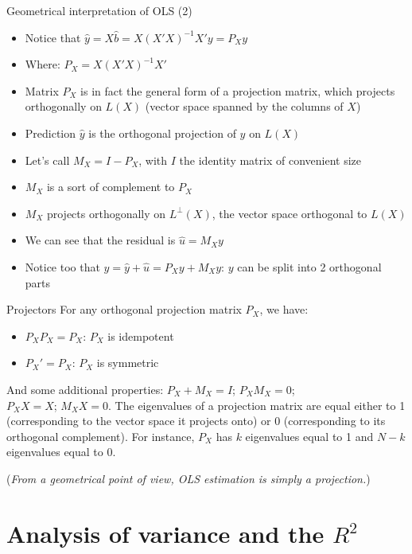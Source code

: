 \documentclass[aspectratio=169]{beamer}
\begin{document}
\begin{frame}{Geometrical interpretation of OLS (2)}
\begin{itemize}
    \item Notice that $\hat{y} = X\hat{b} = X(X'X)^{-1}X'y = P_Xy$
    \item Where: $P_X = X(X'X)^{-1}X'$
    \item Matrix $P_X$ is in fact the general form of a projection matrix, which projects orthogonally on $L(X)$ (vector space spanned by the columns of $X$)
    \item Prediction $\hat{y}$ is the orthogonal projection of $y$ on $L(X)$
    \item Let's call $M_X = I - P_X$, with $I$ the identity matrix of convenient size
    \item $M_X$ is a sort of complement to $P_X$
    \item $M_X$ projects orthogonally on $L^{\perp}(X)$, the vector space orthogonal to $L(X)$
    \item We can see that the residual is $\hat{u} = M_Xy$
    \item Notice too that $y = \hat{y} + \hat{u} = P_Xy + M_Xy$: $y$ can be split into 2 orthogonal parts
\end{itemize}
\end{frame}

\begin{frame}{Projectors}
For any orthogonal projection matrix $P_X$, we have:

\begin{itemize}
    \item $P_XP_X = P_X$: $P_X$ is idempotent
    \item $P_X' = P_X$: $P_X$ is symmetric
\end{itemize}

And some additional properties: $P_X + M_X = I$; $P_XM_X = 0$;\\
$P_XX = X$; $M_XX = 0$. The eigenvalues of a projection matrix are equal either to 1 (corresponding to the vector space it projects onto) or 0 (corresponding to its orthogonal complement). For instance, $P_X$ has $k$ eigenvalues equal to 1 and $N - k$ eigenvalues equal to 0.

(\textit{From a geometrical point of view, OLS estimation is simply a projection.})
\end{frame}

\section{Analysis of variance and the \texorpdfstring{$R^2$}{R2}}
\end{document}
